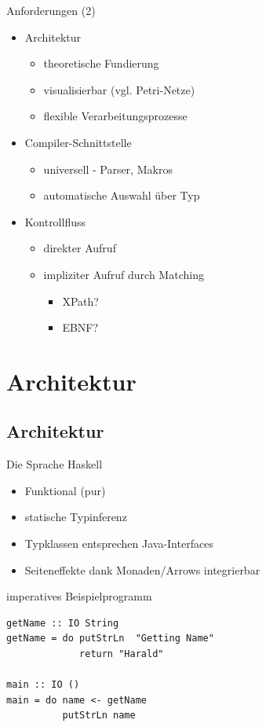 \documentclass{beamer}
\begin{document}
\begin{frame}{Anforderungen (2)}
  \begin{itemize}
  \item Architektur
    \begin{itemize}
    \item theoretische Fundierung
    \item visualisierbar (vgl. Petri-Netze)
    \item flexible Verarbeitungsprozesse
    \end{itemize} 
  \item Compiler-Schnittstelle
    \begin{itemize}
    \item universell - Parser, Makros
    \item automatische Auswahl über Typ
    \end{itemize}
  \item Kontrollfluss
    \begin{itemize}
    \item direkter Aufruf
    \item impliziter Aufruf durch Matching
      \begin{itemize}
      \item XPath?
      \item EBNF?
      \end{itemize}
    \end{itemize}    
  \end{itemize}
\end{frame}

\section{Architektur}
\subsection{Architektur}

\begin{frame}[fragile]{Die Sprache Haskell}
  \begin{itemize}
  \item Funktional (pur)
  \item statische Typinferenz
  \item Typklassen entsprechen Java-Interfaces
  \item Seiteneffekte dank Monaden/Arrows integrierbar
  \end{itemize}
  \begin{block}{imperatives Beispielprogramm}
\begin{verbatim}
getName :: IO String
getName = do putStrLn  "Getting Name"
             return "Harald"

main :: IO ()
main = do name <- getName
          putStrLn name
\end{verbatim}
  \end{block}
\end{frame}
\end{document}
